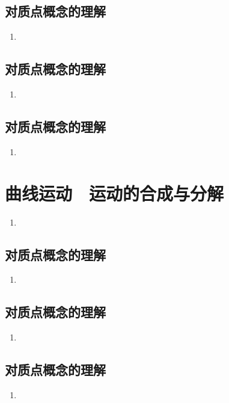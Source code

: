 \documentclass[cn,11pt]{elegantbook}
\begin{document}
\section{对质点概念的理解}
\begin{enumerate}
   \item 
\end{enumerate}

\section{对质点概念的理解}
\begin{enumerate}
   \item 
\end{enumerate}

\section{对质点概念的理解}
\begin{enumerate}
   \item 
\end{enumerate}


\chapter{曲线运动　运动的合成与分解}
\begin{enumerate}
   \item 
\end{enumerate}

\section{对质点概念的理解}
\begin{enumerate}
   \item 
\end{enumerate}

\section{对质点概念的理解}
\begin{enumerate}
   \item 
\end{enumerate}

\section{对质点概念的理解}
\begin{enumerate}
   \item 
\end{enumerate}
\end{document}
